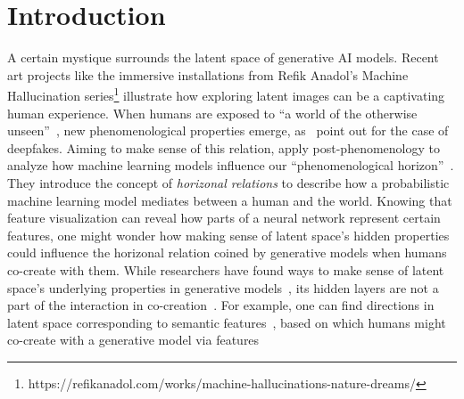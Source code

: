 \documentclass[manuscript]{acmart}
\begin{document}
\section{Introduction}
A certain mystique surrounds the latent space of generative AI models. Recent art projects like the immersive installations from Refik Anadol's Machine Hallucination series\footnote{https://refikanadol.com/works/machine-hallucinations-nature-dreams/} illustrate how exploring latent images can be a captivating human experience. When humans are exposed to ``a world of the otherwise unseen''~\cite[p.1]{seberger_mystics_2020},
new phenomenological properties emerge, as~\citeauthor{seberger_mystics_2020} point out for the case of deepfakes. Aiming to make sense of this relation, \citeauthor{benjamin_machine_2021} apply post-phenomenology to analyze how machine learning models influence our ``phenomenological horizon''~\cite[p.12]{benjamin_machine_2021}. They introduce the concept of \textit{horizonal relations} to describe how a probabilistic machine learning model mediates between a human and the world. Knowing that feature visualization can reveal how parts of a neural network represent certain features, one might wonder how making sense of latent space's hidden properties could influence the horizonal relation coined by generative models when humans co-create with them.
%
While researchers have found ways to make sense of latent space's underlying properties in generative models~\cite{harkonen_ganspace_2020,bau_gan_2019}, 
its hidden layers are not a part of the interaction in co-creation~\cite{grabe_towards_2022}.
For example, one can find directions in latent space corresponding to semantic features~\cite{denton_image_2019,shen_interpreting_2020}, based on which humans might co-create with a generative model via features %
\end{document}
